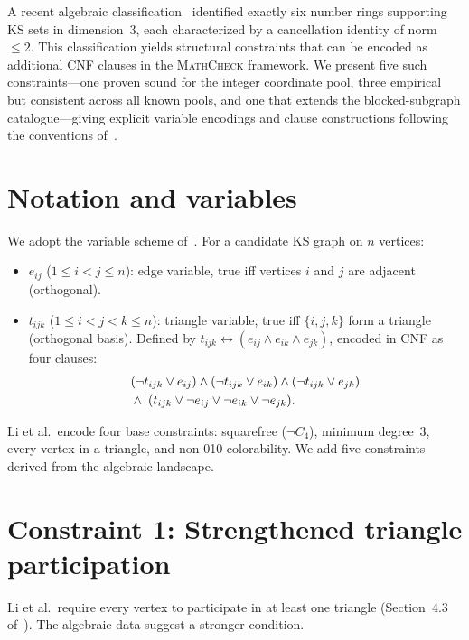 \documentclass[twocolumn,prl,superscriptaddress,nofootinbib]{revtex4-2}
\begin{document}
A recent algebraic classification~\cite{Kernaghan2026landscape,Kernaghan2026sub31} identified exactly six number rings supporting KS sets in dimension~3, each characterized by a cancellation identity of norm~$\leq 2$.  This classification yields structural constraints that can be encoded as additional CNF clauses in the \textsc{MathCheck} framework.  We present five such constraints---one proven sound for the integer coordinate pool, three empirical but consistent across all known pools, and one that extends the blocked-subgraph catalogue---giving explicit variable encodings and clause constructions following the conventions of~\cite{LiBrightGanesh2024}.

\section{Notation and variables}

We adopt the variable scheme of~\cite{LiBrightGanesh2024}.  For a candidate KS graph on $n$ vertices:
\begin{itemize}
\item $e_{ij}$ ($1 \leq i < j \leq n$): edge variable, true iff vertices $i$ and $j$ are adjacent (orthogonal).
\item $t_{ijk}$ ($1 \leq i < j < k \leq n$): triangle variable, true iff $\{i,j,k\}$ form a triangle (orthogonal basis).  Defined by $t_{ijk} \leftrightarrow (e_{ij} \wedge e_{ik} \wedge e_{jk})$, encoded in CNF as four clauses:
\begin{align}
&(\neg t_{ijk} \vee e_{ij}) \wedge (\neg t_{ijk} \vee e_{ik}) \wedge (\neg t_{ijk} \vee e_{jk}) \notag \\
&\wedge\; (t_{ijk} \vee \neg e_{ij} \vee \neg e_{ik} \vee \neg e_{jk}). \notag
\end{align}
\end{itemize}
Li et al.\ encode four base constraints: squarefree ($\neg C_4$), minimum degree~3, every vertex in a triangle, and non-010-colorability.  We add five constraints derived from the algebraic landscape.

\section{Constraint 1: Strengthened triangle participation}

Li et al.\ require every vertex to participate in at least one triangle (Section~4.3 of~\cite{LiBrightGanesh2024}).  The algebraic data suggest a stronger condition.
\end{document}
